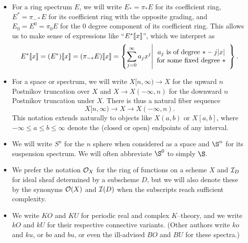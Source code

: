 \begin{itemize}
\item For a ring spectrum $E$, we will write $E_* = \pi_* E$ for its coefficient ring, $E^* = \pi_{-*} E$ for its coefficient ring with the opposite grading, and $E_0 = E^0 = \pi_0 E$ for the $0${\th} degree component of its coefficient ring.  This allows us to make sense of expressions like ``$E^*\llbracket{x}\rrbracket$'', which we interpret as \[E^*\llbracket{x}\rrbracket = (E^*)\llbracket{x}\rrbracket = (\pi_{-*} E)\llbracket{x}\rrbracket = \left\{ \sum_{j=0}^\infty a_j x^j \middle| \begin{array}{c} \text{$a_j$ is of degree $* -j|x|$} \\ \text{for some fixed degree $*$} \end{array} \right\}.\]
\item For a space or spectrum, we will write $X[n, \infty) \to X$ for the upward $n${\th} Postnikov truncation over $X$ and $X \to X(-\infty, n)$ for the downward $n${\th} Postnikov truncation under $X$.  There is thus a natural fiber sequence \[X[n, \infty) \to X \to X(-\infty, n).\]  This notation extends naturally to objects like $X(a, b)$ or $X[a, b]$, where $-\infty \le a \le b \le \infty$ denote the (closed or open) endpoints of any interval.
\item We will write $S^n$ for the $n${\th} sphere when considered as a space and $\S^n$ for its suspension spectrum.  We will often abbreviate $\S^0$ to simply $\S$.
\item We prefer the notation $\mathcal{O}_X$ for the ring of functions on a scheme $X$ and $\mathcal{I}_D$ for ideal sheaf determined by a subscheme $D$, but we will also denote these by the synonyms $\mathcal{O}(X)$ and $\mathcal{I}(D)$ when the subscripts reach sufficient complexity.
\item We write $KO$ and $KU$ for periodic real and complex $K$--theory, and we write $kO$ and $kU$ for their respective connective variants.  (Other authors write $ko$ and $ku$, or $bo$ and $bu$, or even the ill-advised $BO$ and $BU$ for these spectra.)
\end{itemize}
